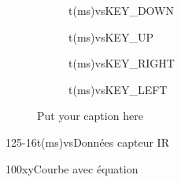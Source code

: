 \documentclass[12pt]{report}
\begin{document}
\begin{figure}
\begin{subfigure}{.5\textwidth}
  \centering
   \centering
 \begin{graphics}{0.9}{0.4}{-0.05}{20}{-1}{6}{t(ms)}{vs}{KEY\_DOWN}
\end{graphics}
\end{subfigure}
\begin{subfigure}{.5\textwidth}
  \centering
   \centering
 \begin{graphics}{0.9}{0.4}{-0.05}{80}{-1}{6}{t(ms)}{vs}{KEY\_UP}
\end{graphics}
\end{subfigure}

\begin{subfigure}{.5\textwidth}
  \centering
 \begin{graphics}{0.9}{0.4}{-0.05}{60}{-1}{6}{t(ms)}{vs}{KEY\_RIGHT}
\end{graphics}
\end{subfigure}
\begin{subfigure}{.5\textwidth}
  \centering
   \centering
 \begin{graphics}{0.9}{0.4}{-0.05}{40}{-1}{6}{t(ms)}{vs}{KEY\_LEFT}
\end{graphics}
\end{subfigure}
\caption{Put your caption here}
\label{fig:fig}
\end{figure}



\begin{exemple}
\begin{graphics}{0.9}{0.4}{-0.05}{125}{-1}{6}{t(ms)}{vs}{Données capteur IR}
\end{graphics}
\end{exemple}


\begin{exemple}
\begin{graphics}{0.4}{0.4}{-10}{10}{-1}{100}{x}{y}{Courbe avec équation}
\end{graphics}
\end{exemple}
\end{document}
